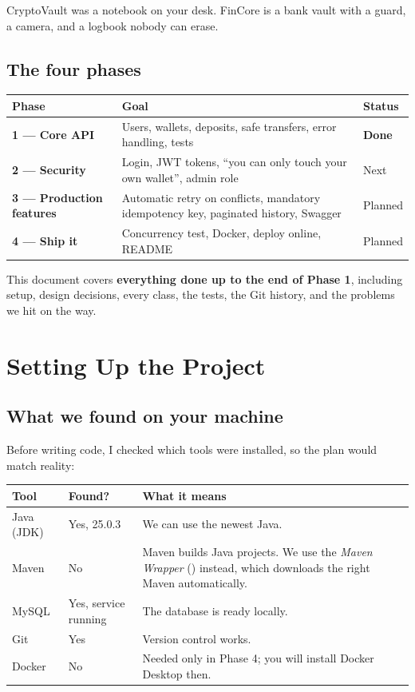 \documentclass[11pt,a4paper]{article}
\newcommand{\code}[1]{\texttt{\detokenize{#1}}}
\begin{document}
\begin{simplebox}
CryptoVault was a notebook on your desk. FinCore is a bank vault with a guard, a camera, and
a logbook nobody can erase.
\end{simplebox}

\subsection{The four phases}
\begin{center}
\begin{tabularx}{\textwidth}{>{\bfseries}l X l}
\toprule
Phase & Goal & Status \\
\midrule
1 --- Core API & Users, wallets, deposits, safe transfers, error handling, tests & \textcolor{okgreen}{\textbf{Done}} \\
2 --- Security & Login, JWT tokens, ``you can only touch your own wallet'', admin role & Next \\
3 --- Production features & Automatic retry on conflicts, mandatory idempotency key, paginated history, Swagger & Planned \\
4 --- Ship it & Concurrency test, Docker, deploy online, README & Planned \\
\bottomrule
\end{tabularx}
\end{center}

This document covers \textbf{everything done up to the end of Phase 1}, including setup,
design decisions, every class, the tests, the Git history, and the problems we hit on the way.

\section{Setting Up the Project}

\subsection{What we found on your machine}
Before writing code, I checked which tools were installed, so the plan would match reality:

\begin{center}
\begin{tabularx}{\textwidth}{l l X}
\toprule
Tool & Found? & What it means \\
\midrule
Java (JDK) & Yes, 25.0.3 & We can use the newest Java. \\
Maven & No & Maven builds Java projects. We use the \emph{Maven Wrapper} (\code{mvnw.cmd}) instead, which downloads the right Maven automatically. \\
MySQL & Yes, service \code{MySQL80} running & The database is ready locally. \\
Git & Yes & Version control works. \\
Docker & No & Needed only in Phase 4; you will install Docker Desktop then. \\
\bottomrule
\end{tabularx}
\end{center}
\end{document}
